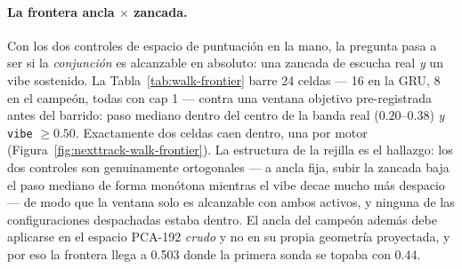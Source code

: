 \documentclass[11pt]{article}
\begin{document}
\paragraph{La frontera ancla $\times$ zancada.} Con los dos controles de espacio
de puntuación en la mano, la pregunta pasa a ser si la \emph{conjunción} es
alcanzable en absoluto: una zancada de escucha real \emph{y} un vibe sostenido.
La Tabla~\ref{tab:walk-frontier} barre \num{24} celdas --- \num{16} en la GRU,
\num{8} en el campeón, todas con cap 1 --- contra una ventana objetivo
pre-registrada antes del barrido: paso mediano dentro del centro de la banda
real ($\numrange{0.20}{0.38}$) \emph{y} \texttt{vibe} $\ge\num{0.50}$.
Exactamente dos celdas caen dentro, una por motor
(Figura~\ref{fig:nexttrack-walk-frontier}). La estructura de la rejilla es el
hallazgo: los dos controles son genuinamente ortogonales --- a ancla fija,
subir la zancada baja el paso mediano de forma monótona mientras el vibe decae
mucho más despacio --- de modo que la ventana solo es alcanzable con ambos
activos, y ninguna de las configuraciones despachadas estaba dentro. El ancla
del campeón además debe aplicarse en el espacio PCA-192 \emph{crudo} y no en su
propia geometría proyectada, y por eso la frontera llega a \num{0.503} donde la
primera sonda se topaba con \num{0.44}.
\end{document}
